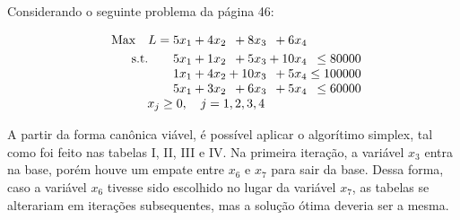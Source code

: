 \documentclass{article}
\begin{document}
Considerando o seguinte problema da página 46:

\[
  \begin{array}{r@{}r@{}r@{}r@{}r@{}r}
    \text{Max} \quad L =  5x_1 &{} + 4x_2 &{} +  8x_3 &{} + 6x_4 &{}             \\[\jot]
    \text{s.t.}\quad\quad 5x_1 &{} + 1x_2 &{} +  5x_3 &{} + 10x_4 &{} \leq  80000 \\
                          1x_1 &{} + 4x_2 &{} + 10x_3 &{} + 5x_4 &{} \leq 100000 \\
                          5x_1 &{} + 3x_2 &{} +  6x_3 &{} + 5x_4 &{} \leq  60000 \\

    \multicolumn{4}{c}{x_j \geq 0, \quad j=1, 2, 3, 4}
  \end{array}
\]

A partir da forma canônica viável, é possível aplicar o algorítimo simplex, tal como foi feito nas tabelas I, II, III e IV.
Na primeira iteração, a variável $x_3$ entra na base, porém houve um empate entre $x_6$ e $x_7$ para sair da base.
Dessa forma, caso a variável $x_6$ tivesse sido escolhido no lugar da variável $x_7$, as tabelas se alterariam em iterações subsequentes, mas a solução ótima deveria ser a mesma. 
\end{document}
